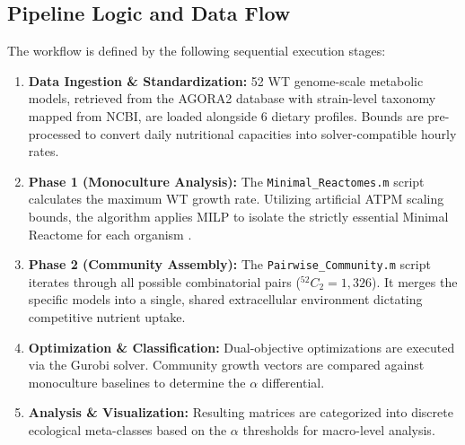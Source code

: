 \documentclass[11pt, a4paper]{article}
\begin{document}
\subsection{Pipeline Logic and Data Flow}
The workflow is defined by the following sequential execution stages:
\begin{enumerate}[itemsep=2pt, parsep=0pt, topsep=4pt]
    \item \textbf{Data Ingestion \& Standardization:} 52 WT genome-scale metabolic models, retrieved from the AGORA2 database with strain-level taxonomy mapped from NCBI, are loaded alongside 6 dietary profiles. Bounds are pre-processed to convert daily nutritional capacities into solver-compatible hourly rates.
    \item \textbf{Phase 1 (Monoculture Analysis):} The \texttt{Minimal\_Reactomes.m} script calculates the maximum WT growth rate. Utilizing artificial ATPM scaling bounds, the algorithm applies MILP to isolate the strictly essential Minimal Reactome for each organism \cite{1}.
    \item \textbf{Phase 2 (Community Assembly):} The \texttt{Pairwise\_Community.m} script iterates through all possible combinatorial pairs (${}^{52}C_{2} = 1,326$). It merges the specific models into a single, shared extracellular environment dictating competitive nutrient uptake.
    \item \textbf{Optimization \& Classification:} Dual-objective optimizations are executed via the Gurobi solver. Community growth vectors are compared against monoculture baselines to determine the $\alpha$ differential.
    \item \textbf{Analysis \& Visualization:} Resulting matrices are categorized into discrete ecological meta-classes based on the $\alpha$ thresholds for macro-level analysis.
\end{enumerate}
\end{document}
